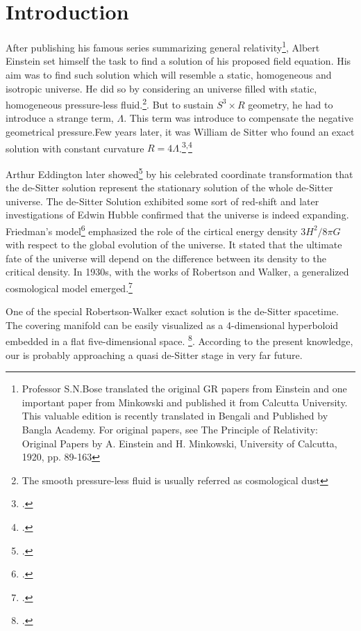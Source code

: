 \chapter{Introduction}



After publishing his famous series summarizing general relativity\footnote{Professor S.N.Bose translated the original GR papers from Einstein and one important paper from Minkowski and published it from Calcutta University. This valuable edition is recently translated in Bengali and Published by Bangla Academy. For original papers, see The Principle of Relativity: Original Papers by A. Einstein and H. Minkowski, University of Calcutta, 1920, pp. 89-163}, Albert Einstein set himself the task to find a solution of his proposed field equation. His aim was to find such solution which will resemble a static, homogeneous and isotropic universe. He did so by considering an universe filled with static, homogeneous pressure-less fluid.\footnote{The smooth pressure-less fluid is usually referred as cosmological dust}. But to sustain $S^3 \times R$ geometry, he had to introduce a strange term, $\Lambda$. This term was introduce to compensate the negative geometrical pressure.Few years later, it was William de Sitter who found an exact solution with constant curvature $R=4\Lambda$.\footcite{de:1917a}\textsuperscript{,}\footcite{de:1917b}

Arthur Eddington later showed\footcite{eddington:1924} by his celebrated coordinate transformation that the de-Sitter solution represent the stationary solution of the whole de-Sitter universe. The de-Sitter Solution exhibited some sort of red-shift and later investigations of Edwin Hubble confirmed that the universe is  indeed  expanding. Friedman's model\footcite{friedman:1999} emphasized the role of the cirtical energy density $3H^2/8\pi G$ with respect to the global evolution of the universe. It stated that the ultimate fate of the universe will depend on the difference between its density to the critical density. In 1930s, with the works of Robertson and Walker, a generalized cosmological model emerged.\footcite[For a review see][]{carroll:2004}

One of the special Robertson-Walker exact solution is the de-Sitter spacetime. The covering manifold can be easily visualized as a 4-dimensional hyperboloid embedded in a flat five-dimensional space. \footcite{hawking:1973}. According to the present knowledge, our is probably approaching a quasi de-Sitter stage in very far future.

